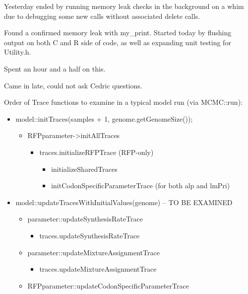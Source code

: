 \documentclass[12pt,hyperref]{labbook}
\begin{document}

Yesterday ended by running memory leak checks in the background on a whim due to debugging
some new calls without associated delete calls.

Found a confirmed memory leak with my\_print. Started today by flushing output on
both C and R side of code, as well as expanding unit testing for Utility.h.

Spent an hour and a half on this.

Came in late, could not ask Cedric questions.

Order of Trace functions to examine in a typical model run (via MCMC::run):
\begin{itemize}
    \item model::initTraces(samples + 1, genome.getGenomeSize());
    \begin{itemize}
        \item RFPparameter-\textgreater initAllTraces
        \begin{itemize}
            \item traces.initializeRFPTrace (RFP-only)
            \begin{itemize}
                \item initializeSharedTraces
                \item initCodonSpecificParameterTrace (for both alp and lmPri)
            \end{itemize}
        \end{itemize}
    \end{itemize}
    \item model::updateTracesWithInitialValues(genome) -- TO BE EXAMINED
    \begin{itemize}
        \item parameter::updateSynthesisRateTrace
        \begin{itemize}
            \item traces.updateSynthesisRateTrace
        \end{itemize}
        \item parameter::updateMixtureAssignmentTrace
        \begin{itemize}
            \item traces.updateMixtureAssignmentTrace
        \end{itemize}
        \item RFPparameter::updateCodonSpecificParameterTrace
        \begin{itemize}

\end{itemize}
\end{itemize}
\end{itemize}
\end{document}
